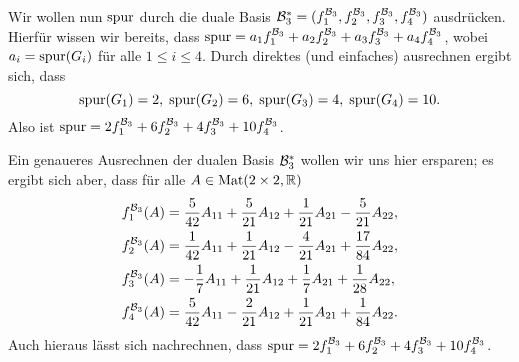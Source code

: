 \documentclass[a4paper,10pt]{article}
\begin{document}
Wir wollen nun $\mathrm{spur}$ durch die duale Basis $\mathcal{B}_3^* = (f^{\mathcal{B}_3}_1, f^{\mathcal{B}_3}_2, f^{\mathcal{B}_3}_3, f^{\mathcal{B}_3}_4)$ ausdrücken. Hierfür wissen wir bereits, dass $\mathrm{spur} = a_1 f^{\mathcal{B}_3}_1 + a_2 f^{\mathcal{B}_3}_2 + a_3 f^{\mathcal{B}_3}_3 + a_4 f^{\mathcal{B}_3}_4$, wobei $a_i = \mathrm{spur}(G_i)$ für alle $1 \leq i \leq 4$. Durch direktes (und einfaches) ausrechnen ergibt sich, dass
\[
 \mathrm{spur}(G_1) = 2, \;
 \mathrm{spur}(G_2) = 6, \;
 \mathrm{spur}(G_3) = 4, \;
 \mathrm{spur}(G_4) = 10.
\]
Also ist $\mathrm{spur} = 2 f^{\mathcal{B}_3}_1 + 6 f^{\mathcal{B}_3}_2 + 4 f^{\mathcal{B}_3}_3 + 10 f^{\mathcal{B}_3}_4$.

Ein genaueres Ausrechnen der dualen Basis $\mathcal{B}_3^*$ wollen wir uns hier ersparen; es ergibt sich aber, dass für alle $A \in \mathrm{Mat}(2 \times 2, \mathbb{R})$
\begin{align*}
 f^{\mathcal{B}_3}_1(A) &= \frac{5}{42} A_{11} + \frac{5}{21} A_{12} + \frac{1}{21} A_{21} -\frac{5}{21} A_{22}, \\
 f^{\mathcal{B}_3}_2(A) &= \frac{1}{42} A_{11} + \frac{1}{21} A_{12} - \frac{4}{21} A_{21} + \frac{17}{84} A_{22}, \\
 f^{\mathcal{B}_3}_3(A) &= -\frac{1}{7} A_{11} + \frac{1}{21} A_{12} + \frac{1}{7} A_{21} + \frac{1}{28} A_{22}, \\
 f^{\mathcal{B}_3}_4(A) &= \frac{5}{42} A_{11} - \frac{2}{21} A_{12} + \frac{1}{21} A_{21} + \frac{1}{84} A_{22}.
\end{align*}
Auch hieraus lässt sich nachrechnen, dass $\mathrm{spur} = 2 f^{\mathcal{B}_3}_1 + 6 f^{\mathcal{B}_3}_2 + 4 f^{\mathcal{B}_3}_3 + 10 f^{\mathcal{B}_3}_4$.
\end{document}
